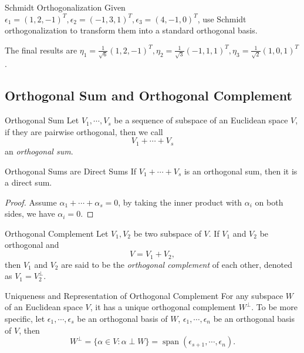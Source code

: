 \begin{example}{Schmidt Orthogonalization}{}
  Given $\epsilon_1 = (1, 2, -1)^T, \epsilon_2 = (-1,3,1)^T, \epsilon_3 =
  (4,-1,0)^T$,
  use Schmidt orthogonalization to transform them into a standard orthogonal basis.
\end{example}

\begin{solution}
  The final results are $\eta_{1}=\frac{1}{\sqrt{6}}(1,2,-1)^{T},\eta_{2}=\frac{1}{\sqrt{3}}(-1,1,1)^{T},\eta_{3}=\frac{1}{\sqrt{2}}(1,0,1)^{T}$.
\end{solution}

\subsection{Orthogonal Sum and Orthogonal Complement}

\begin{definition}{Orthogonal Sum}{}
  Let $V_1, \cdots, V_s$ be a sequence of subspace of an Euclidean space $V$,
  if they are pairwise orthogonal, then we call
  \begin{equation}
    V_1 + \cdots + V_s
  \end{equation}
  an \emph{orthogonal sum}.
\end{definition}

\begin{proposition}{Orthogonal Sums are Direct Sums}{}
  If $V_1 + \cdots +V_s$ is an orthogonal sum,
  then it is a direct sum.
\end{proposition}

\begin{proof}
  Assume $\alpha_1 + \cdots + \alpha_s = 0$,
  by taking the inner product with $\alpha_i$ on both sides, we have $\alpha_i = 0$.
\end{proof}

\begin{definition}{Orthogonal Complement}{}
  Let $V_1, V_2$ be two subspace of $V$.
  If $V_1$ and $V_2$ be orthogonal and
  \begin{equation}
    V = V_1 + V_2,
  \end{equation}
  then $V_1$ and $V_2$ are said to be the \emph{orthogonal complement} of each
  other,
  denoted as $V_1 = V_2^{\perp}$.
\end{definition}

\begin{proposition}{Uniqueness and Representation of Orthogonal Complement}{}
  For any subspace $W$ of an Euclidean space $V$,
  it has a unique orthogonal complement $W^{\perp}$.
  To be more specific,
  let $\epsilon_1,\cdots,\epsilon_s$ be an orthogonal basis of $W$,
  $\epsilon_1,\cdots,\epsilon_n$ be an orthogonal basis of $V$,
  then
  \begin{equation}
    W^{\perp} = \{\alpha \in V: \alpha \perp W\} = \operatorname{span}(\epsilon_{s+1},\cdots,\epsilon_n).
  \end{equation}
\end{proposition}

